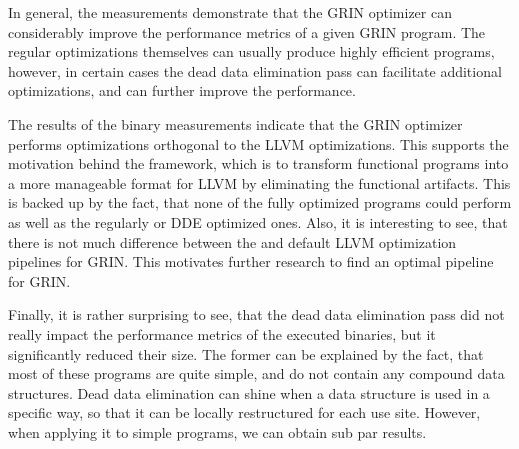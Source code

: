 \documentclass[main.tex]{subfiles}
\begin{document}
	In general, the measurements demonstrate that the GRIN optimizer can considerably improve the performance metrics of a given GRIN program. The regular optimizations themselves can usually produce highly efficient programs, however, in certain cases the dead data elimination pass can facilitate additional optimizations, and can further improve the performance.
	
	The results of the binary measurements indicate that the GRIN optimizer performs optimizations orthogonal to the LLVM optimizations. This supports the motivation behind the framework, which is to transform functional programs into a more manageable format for LLVM by eliminating the functional artifacts. This is backed up by the fact, that none of the fully optimized  programs could perform as well as the regularly or DDE optimized ones. Also, it is interesting to see, that there is not much difference between the  and  default LLVM optimization pipelines for GRIN. This motivates further research to find an optimal pipeline for GRIN. 
	
	Finally, it is rather surprising to see, that the dead data elimination pass did not really impact the performance metrics of the executed binaries, but it significantly reduced their size. The former can be explained by the fact, that most of these programs are quite simple, and do not contain any compound data structures. Dead data elimination can shine when a data structure is used in a specific way, so that it can be locally restructured for each use site. However, when applying it to simple programs, we can obtain sub par results.
\end{document}
